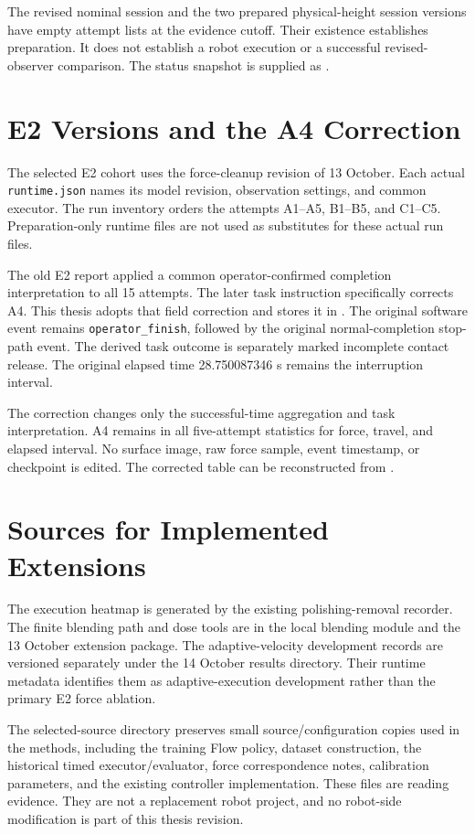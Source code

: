 The revised nominal session and the two prepared physical-height session versions have empty attempt lists at the evidence cutoff. Their existence establishes preparation. It does not establish a robot execution or a successful revised-observer comparison. The status snapshot is supplied as .

\section{E2 Versions and the A4 Correction}
The selected E2 cohort uses the force-cleanup revision of 13 October. Each actual \texttt{runtime.json} names its model revision, observation settings, and common executor. The run inventory orders the attempts A1--A5, B1--B5, and C1--C5. Preparation-only runtime files are not used as substitutes for these actual run files.

The old E2 report applied a common operator-confirmed completion interpretation to all 15 attempts. The later task instruction specifically corrects A4. This thesis adopts that field correction and stores it in . The original software event remains \texttt{operator\_finish}, followed by the original normal-completion stop-path event. The derived task outcome is separately marked incomplete contact release. The original elapsed time 28.750087346 s remains the interruption interval.

The correction changes only the successful-time aggregation and task interpretation. A4 remains in all five-attempt statistics for force, travel, and elapsed interval. No surface image, raw force sample, event timestamp, or checkpoint is edited. The corrected table can be reconstructed from .

\section{Sources for Implemented Extensions}
The execution heatmap is generated by the existing polishing-removal recorder. The finite blending path and dose tools are in the local blending module and the 13 October extension package. The adaptive-velocity development records are versioned separately under the 14 October results directory. Their runtime metadata identifies them as adaptive-execution development rather than the primary E2 force ablation.

The selected-source directory preserves small source/configuration copies used in the methods, including the training Flow policy, dataset construction, the historical timed executor/evaluator, force correspondence notes, calibration parameters, and the existing controller implementation. These files are reading evidence. They are not a replacement robot project, and no robot-side modification is part of this thesis revision.

